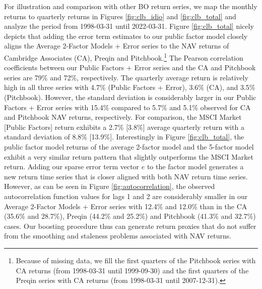\documentclass[12pt]{article}
\begin{document}
For illustration and comparison with other BO return series, we map the monthly returns to quarterly returns in Figures \ref{fig:clb_idio} and \ref{fig:clb_total} and analyze the period from 1998-03-31 until 2022-03-31.
Figure \ref{fig:clb_total} nicely depicts that adding the error term estimates to our public factor model closely aligns the Average 2-Factor Models + Error series to the NAV returns of Cambridge Associates (CA), Preqin and Pitchbook.\footnote{Because of missing data, we fill the first quarters of the Pitchbook series with CA returns (from 1998-03-31 until 1999-09-30) and the first quarters of the Preqin series with CA returns (from 1998-03-31 until 2007-12-31).
}
The Pearson correlation coefficients between our Public Factors + Error series and the CA and Pitchbook series are 79\% and 72\%, respectively.
The quarterly average return is relatively high in all three series with 4.7\% (Public Factors + Error), 3.6\% (CA), and 3.5\% (Pitchbook).
However, the standard deviation is considerably larger in our Public Factors + Error series with 15.4\% compared to 5.7\% and 5.1\% observed for CA and Pitchbook NAV returns, respectively.
For comparison, the MSCI Market [Public Factors] return exhibits a 2.7\% [3.8\%] average quarterly return with a standard deviation of 8.8\% [13.9\%].
Interestingly in Figure \ref{fig:clb_total}, the public factor model returns of the average 2-factor model and the 5-factor model exhibit a very similar return pattern that slightly outperforms the MSCI Market return.
Adding our sparse error term vector $e$ to the factor model generates a new return time series that is closer aligned with both NAV return time series.
However, as can be seen in Figure \ref{fig:autocorrelation}, the observed autocorrelation function values for lags 1 and 2 are considerably smaller in our Average 2-Factor Models + Error series with 12.4\% and 12.0\% than in the CA (35.6\% and 28.7\%), Preqin (44.2\% and 25.2\%) and Pitchbook (41.3\% and 32.7\%) cases.
Our boosting procedure thus can generate return proxies that do not suffer from the smoothing and staleness problems associated with NAV returns.
\end{document}
